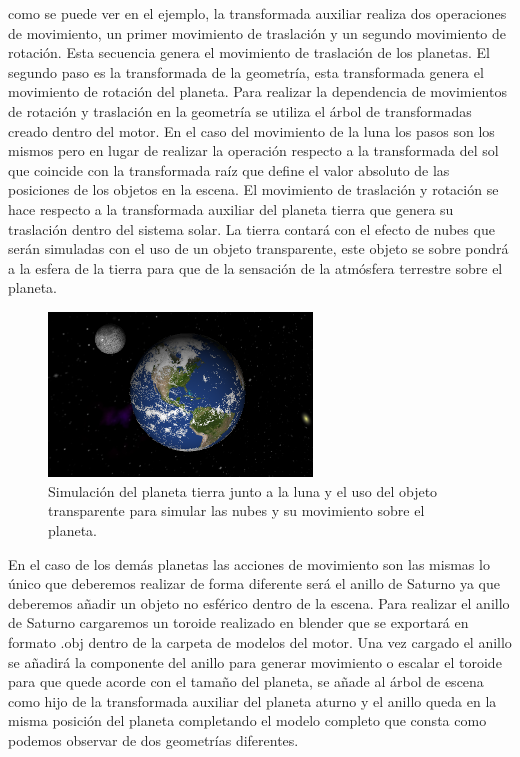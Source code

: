 \documentclass[a4paper]{book}
\begin{document}
como se puede ver en el ejemplo, la transformada auxiliar realiza dos operaciones de movimiento, un primer movimiento
de traslación y un segundo movimiento de rotación. Esta secuencia genera el movimiento de traslación de los planetas.
El segundo paso es la transformada de la geometría, esta transformada genera el movimiento de rotación del planeta. Para realizar la
dependencia de movimientos de rotación y traslación en la geometría se utiliza el árbol de transformadas
creado dentro del motor. En el caso del movimiento de la luna los pasos son los mismos pero en lugar de realizar la operación
respecto a la transformada del sol que coincide con la transformada raíz que define el valor absoluto de las posiciones de los
objetos en la escena. El movimiento de traslación y rotación se hace respecto a la transformada auxiliar del planeta tierra
que genera su traslación dentro del sistema solar. La tierra contará con el efecto de nubes que serán simuladas con el uso
de un objeto transparente, este objeto se sobre pondrá a la esfera de la tierra para que de la sensación de la atmósfera
terrestre sobre el planeta.

\begin{figure}[H]
    \centering
    \includegraphics[width=7cm, keepaspectratio]{img/Earth.png}
    \caption{Simulación del planeta tierra junto a la luna y el uso del objeto transparente para simular las nubes y su
    movimiento sobre el planeta.}
    \label{Earth}
\end{figure}

En el caso de los demás planetas las acciones de movimiento son las mismas lo único que deberemos realizar de forma diferente
será el anillo de Saturno ya que deberemos añadir un objeto no esférico dentro de la escena. Para realizar el anillo de Saturno cargaremos
un toroide realizado en blender que se exportará en formato .obj dentro de la carpeta de modelos del motor. Una vez cargado el anillo se
añadirá la componente del anillo para generar movimiento o escalar el toroide para que quede acorde con el tamaño del planeta, se añade al
árbol de escena como hijo de la transformada auxiliar del planeta aturno y el anillo queda en la misma posición del planeta completando el modelo completo que consta como podemos observar de
dos geometrías diferentes.
\end{document}
